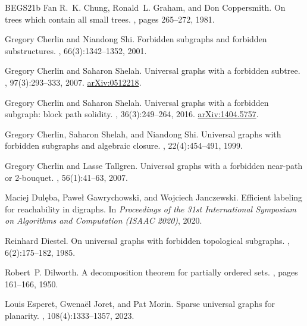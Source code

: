 \documentclass[11pt]{article}
\newcommand{\1}{\mathbbm{1}}
\begin{document}
\begin{thebibliography}{BEGS21b}
Fan R.~K. Chung, Ronald~L. Graham, and Don Coppersmith.
\newblock On trees which contain all small trees.
, pages 265--272, 1981.

Gregory Cherlin and Niandong Shi.
\newblock Forbidden subgraphs and forbidden substructures.
, 66(3):1342--1352, 2001.

Gregory Cherlin and Saharon Shelah.
\newblock Universal graphs with a forbidden subtree.
, 97(3):293--333, 2007.
\newblock \href{https://arxiv.org/abs/math/0512218}{arXiv:0512218}.

Gregory Cherlin and Saharon Shelah.
\newblock Universal graphs with a forbidden subgraph: block path solidity.
, 36(3):249--264, 2016.
\newblock \href{https://arxiv.org/abs/1404.5757}{arXiv:1404.5757}.

Gregory Cherlin, Saharon Shelah, and Niandong Shi.
\newblock Universal graphs with forbidden subgraphs and algebraic closure.
, 22(4):454--491, 1999.

Gregory Cherlin and Lasse Tallgren.
\newblock Universal graphs with a forbidden near-path or 2-bouquet.
, 56(1):41--63, 2007.

Maciej Dul{\k{e}}ba, Pawe{\l} Gawrychowski, and Wojciech Janczewski.
\newblock Efficient labeling for reachability in digraphs.
\newblock In {\em Proceedings of the 31st International Symposium on Algorithms and Computation {(ISAAC 2020)}}, 2020.

Reinhard Diestel.
\newblock On universal graphs with forbidden topological subgraphs.
, 6(2):175--182, 1985.

Robert~P. Dilworth.
\newblock A decomposition theorem for partially ordered sets.
, pages 161--166, 1950.

Louis Esperet, Gwena{\"e}l Joret, and Pat Morin.
\newblock Sparse universal graphs for planarity.
, 108(4):1333--1357, 2023.


\end{thebibliography}
\end{document}
